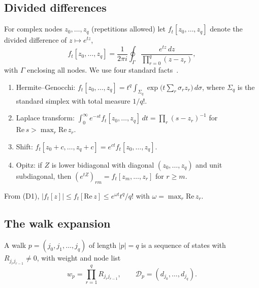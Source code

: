\documentclass[aps,pra,superscriptaddress,floatfix,longbibliography,twocolumn]{revtex4-2}
\begin{document}
\subsection{Divided differences}
For complex nodes $z_0,\dots,z_q$ (repetitions allowed) let $f_t[z_0,\dots,z_q]$ denote the divided difference of $z\mapsto e^{tz}$,
\begin{equation}\label{eq:dd_contour}
f_t[z_0,\dots,z_q]=\frac{1}{2\pi i}\oint_\Gamma \frac{e^{tz}\,dz}{\prod_{r=0}^q (z-z_r)} ,
\end{equation}
with $\Gamma$ enclosing all nodes. We use four standard facts~\cite{deboor2005,higham2008,opitz1964}.
\begin{enumerate}
\item[(D1)] Hermite--Genocchi: $f_t[z_0,\dots,z_q]=t^q\int_{\Sigma_q}\exp\!\big(t\sum_r\sigma_r z_r\big)\,d\sigma$, where $\Sigma_q$ is the standard simplex with total measure $1/q!$.
\item[(D2)] Laplace transform: $\int_0^\infty e^{-st}f_t[z_0,\dots,z_q]\,dt=\prod_r (s-z_r)^{-1}$ for $\mathrm{Re}\,s>\max_r\mathrm{Re}\,z_r$.
\item[(D3)] Shift: $f_t[z_0+c,\dots,z_q+c]=e^{ct}f_t[z_0,\dots,z_q]$.
\item[(D4)] Opitz: if $Z$ is lower bidiagonal with diagonal $(z_0,\dots,z_q)$ and unit subdiagonal, then $(e^{tZ})_{rm}=f_t[z_m,\dots,z_r]$ for $r\ge m$.
\end{enumerate}
From (D1), $|f_t[z]|\le f_t[\mathrm{Re}\,z]\le e^{\omega t}t^q/q!$ with $\omega=\max_r\mathrm{Re}\,z_r$.

\subsection{The walk expansion}
A walk $p=(j_0,j_1,\dots,j_q)$ of length $|p|=q$ is a sequence of states with $R_{j_rj_{r-1}}\neq0$, with weight and node list
\begin{equation}
w_p=\prod_{r=1}^q R_{j_r j_{r-1}},\qquad \mathcal{D}_p=(d_{j_0},\dots,d_{j_q}).
\end{equation}
\end{document}
